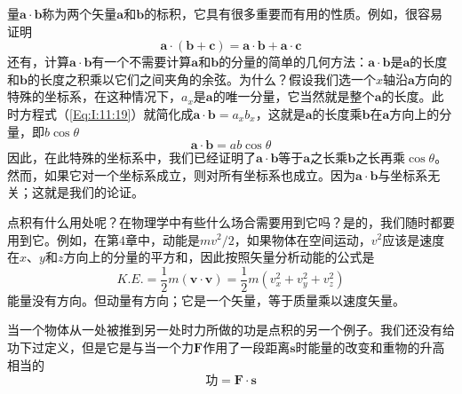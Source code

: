 量$\boldsymbol{a} \cdot \boldsymbol{b}$称为两个矢量$\boldsymbol{a}$和$\boldsymbol{b}$的标积，它具有很多重要而有用的性质。例如，很容易证明
\begin{equation}
    \label{Eq:I:11:21}
    \boldsymbol{a} \cdot (\boldsymbol{b}+\boldsymbol{c})=\boldsymbol{a} \cdot \boldsymbol{b}+\boldsymbol{a} \cdot \boldsymbol{c}
\end{equation}
还有，计算$\boldsymbol{a} \cdot \boldsymbol{b}$有一个不需要计算$\boldsymbol{a}$和$\boldsymbol{b}$的分量的简单的几何方法：$\boldsymbol{a} \cdot \boldsymbol{b}$是$\boldsymbol{a}$的长度和$\boldsymbol{b}$的长度之积乘以它们之间夹角的余弦。为什么？假设我们选一个$x$轴沿$\boldsymbol{a}$方向的特殊的坐标系，在这种情况下，$a_x$是$\boldsymbol{a}$的唯一分量，它当然就是整个$\boldsymbol{a}$的长度。此时方程式（\ref{Eq:I:11:19}）就简化成$\boldsymbol{a} \cdot \boldsymbol{b}=a_xb_x$，这就是$\boldsymbol{a}$的长度乘$\boldsymbol{b}$在$\boldsymbol{a}$方向上的分量，即$b\cos\theta$
\begin{equation*}
    \boldsymbol{a} \cdot \boldsymbol{b}=ab\cos\theta
\end{equation*}
因此，在此特殊的坐标系中，我们已经证明了$\boldsymbol{a} \cdot \boldsymbol{b}$等于$\boldsymbol{a}$之长乘$\boldsymbol{b}$之长再乘$\cos\theta$。然而，如果它对一个坐标系成立，则对所有坐标系也成立。因为$\boldsymbol{a} \cdot \boldsymbol{b}$与坐标系无关；这就是我们的论证。

点积有什么用处呢？在物理学中有些什么场合需要用到它吗？是的，我们随时都要用到它。例如，在第4章中，动能是$mv^2/2$，如果物体在空间运动，$v^2$应该是速度在$x$、$y$和$z$方向上的分量的平方和，因此按照矢量分析动能的公式是
\begin{equation}
    \label{Eq:I:11:22}
    K.E.=\frac{1}{2}m(\boldsymbol{v} \cdot \boldsymbol{v})=\frac{1}{2}m(v_x^2+v_y^2+v_z^2)
\end{equation}
能量没有方向。但动量有方向；它是一个矢量，等于质量乘以速度矢量。

当一个物体从一处被推到另一处时力所做的功是点积的另一个例子。我们还没有给功下过定义，但是它是与当一个力$\boldsymbol{F}$作用了一段距离$\boldsymbol{s}$时能量的改变和重物的升高相当的
\begin{equation}
    \label{Eq:I:11:23}
    \text{功}=\boldsymbol{F} \cdot \boldsymbol{s}
\end{equation}

